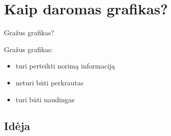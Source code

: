 \documentclass{beamer}
\makeatletter
\newcommand*{\currentname}{\@currentlabelname}
\makeatother
\begin{document}
\section{Kaip daromas grafikas?}
\frame{\tableofcontents[currentsection, subsectionstyle=show/shaded/hide]}


\begin{frame}{\currentname}
\begin{center}
\large Gražus grafikas?
\end{center}
\end{frame}

\begin{frame}{\currentname}
  Gražus grafikas:
  \begin{itemize}
    \item<1-> turi perteikti norimą informaciją
    \item<2-> neturi būti perkrautas
    \item<3-> turi būti naudingas
  \end{itemize}
\end{frame}

\subsection{Idėja}
\frame{\tableofcontents[currentsection, subsectionstyle=show/shaded/hide]}
\end{document}

